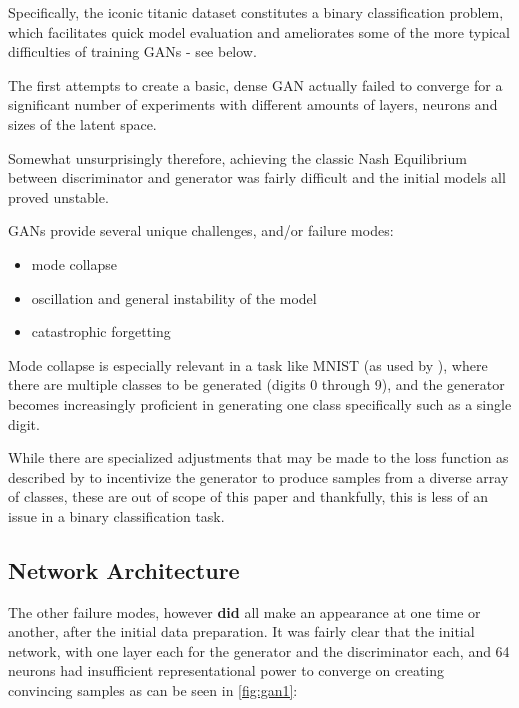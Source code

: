 Specifically, the iconic titanic dataset constitutes a binary classification problem, which facilitates quick model evaluation and ameliorates some of the more typical difficulties of training \acp{GAN} - see below.

The first attempts to create a basic, dense \ac{GAN} actually failed to converge for a significant number of experiments with different amounts of layers, neurons and sizes of the latent space. 

Somewhat unsurprisingly therefore, achieving the classic Nash Equilibrium between discriminator and generator was fairly difficult and the initial models all proved unstable. 

\acp{GAN} provide several unique challenges, and/or failure modes:

\begin{itemize}
	\item mode collapse \cite{mode_collapse}
	\item oscillation and general instability of the model \cite{gan_continual_learning}
	\item catastrophic forgetting \cite{catastrophic_forgetting}
\end{itemize}

Mode collapse is especially relevant in a task like MNIST (as used by \cite{goodfellow2014generative}), where there are multiple classes to be generated (digits 0 through 9), and the generator becomes increasingly proficient in generating one class specifically such as a single digit. 

While there are specialized adjustments that may be made to the loss function as described by \cite{mode_collapse} to incentivize the generator to produce samples from a diverse array of classes, these are out of scope of this paper and thankfully, this is less of an issue in a binary classification task.

\pagebreak

\subsection{Network Architecture}
\label{subsection:architecture}

The other failure modes, however \textbf{did} all make an appearance at one time or another, after the initial data preparation. It was fairly clear that the initial network, with one layer each for the generator and the discriminator each, and 64 neurons had insufficient representational power to converge on creating convincing samples as can be seen in \ref{fig:gan1}:

